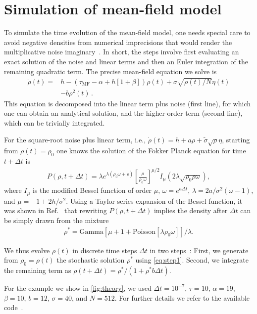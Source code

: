 \section{Simulation of mean-field model} \label{sec:appendix_meanfield}

To simulate the time evolution of the mean-field model, one needs special care to avoid negative densities from numerical imprecisions that would render the multiplicative noise imaginary~\cite{dornic_integration_2005}.
In short, the steps involve first evaluating an exact solution of the noise and linear terms and then an Euler integration of the remaining quadratic term.
The precise mean-field equation we solve is
\begin{align}
    \dot{\rho}(t) = &h - \left(\tau_\mathrm{MF}-\alpha +h[1+\beta]\right)\rho(t)+ \sigma\sqrt{\rho(t)/N}\eta(t)\nonumber\\
    &-b\rho^2(t) \, .
\end{align}
This equation is decomposed into the linear term plus noise (first line), for which one can obtain an analytical solution, and the higher-order term (second line), which can be trivially integrated.

For the square-root noise plus linear term, i.e., $\dot{\rho}(t)=h+a\rho +\tilde{\sigma}\sqrt{\rho}\eta$, starting from $\rho(t)=\rho_0$ one knows the solution of the Fokker Planck equation for time $t+\Delta t$ is~\cite{feller_two_1951}
\begin{align}
    P(\rho,t+\Delta t) = \lambda e^{\lambda\left(\rho_0\omega+\rho\right)}\left[\frac{\rho}{\rho_0\omega}\right]^{\mu/2} I_\mu\left(2\lambda\sqrt{\rho_0\rho\omega}\right),
\end{align}
where $I_\mu$ is the modified Bessel function of order $\mu$, $\omega=e^{a\Delta t}$, $\lambda=2a/\sigma^2\left(\omega-1\right)$, and $\mu=-1+2h/\sigma^2$.
Using a Taylor-series expansion of the Bessel function, it was shown in Ref.~\cite{dornic_integration_2005} that rewriting $P(\rho,t+\Delta t)$ implies the density after $\Delta t$ can be simply drawn from the mixture
\begin{align}\label{eq:step1}
    \rho^\ast = \text{Gamma}\left[\mu + 1 + \text{Poisson}\left[\lambda\rho_0\omega\right]\right]/\lambda.
\end{align}

We thus evolve $\rho(t)$ in discrete time steps $\Delta t$ in two steps~\cite{dornic_integration_2005}:
First, we generate from $\rho_0=\rho(t)$ the stochastic solution $\rho^\ast$ using \cref{eq:step1}.
Second, we integrate the remaining term as $\rho(t+\Delta t)=\rho^\ast/(1+\rho^\ast b \Delta t)$.

For the example we show in \cref{fig:theory}, we used $\Delta t=10^{-7}$, $\tau=10$, $\alpha=19$, $\beta=10$, $b=12$, $\sigma=40$, and $N=512$. For further details we refer to the available code~\cite{noauthor_benjamincramerneuromorphic-bistability_nodate}.
